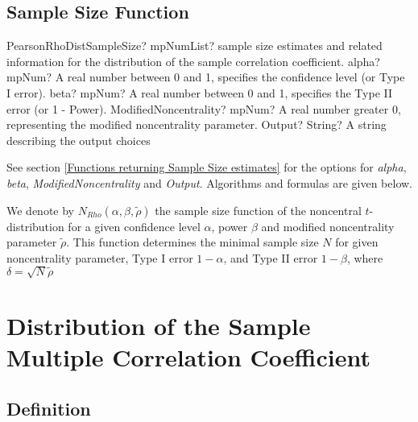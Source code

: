\subsection{Sample Size Function}
\label{PearsonRhoDistributionSampleSize}

\begin{mpFunctionsExtract}
	\mpFunctionFourNotImplemented
	{PearsonRhoDistSampleSize? mpNumList? sample size estimates and related information for the distribution of the sample correlation coefficient.}
	{alpha? mpNum? A real number between 0 and 1, specifies the confidence level (or Type I error).}
	{beta? mpNum?  A real number between 0 and 1, specifies the Type II error (or 1 - Power).}
	{ModifiedNoncentrality? mpNum? A real number greater 0, representing the modified noncentrality parameter.}
	{Output? String? A string describing the output choices}
\end{mpFunctionsExtract}

\vspace{0.3cm}
See section \ref{Functions returning Sample Size estimates} for the options for  {\itshape\sffamily alpha}, {\itshape\sffamily beta}, {\itshape\sffamily ModifiedNoncentrality} and {\itshape\sffamily Output}. Algorithms and formulas are given below.

\vspace{0.3cm}
We denote by $N_{Rho}\left(\alpha, \beta, \widetilde{\rho} \right)$  the sample size function of the noncentral $t$-distribution for a given confidence level $\alpha$, power $\beta$ and modified noncentrality parameter $\widetilde{\rho}$. This function determines the minimal sample size $N$ for given noncentrality parameter, Type I error $1-\alpha$, and Type II error $1-\beta$, where  $\delta = \sqrt{N}\widetilde{\rho}$ 





\newpage
\section{Distribution of the Sample Multiple Correlation Coefficient}
\label{Rho2Distribution}



\subsection{Definition}
\label{Rho2DistributionDefinition}

